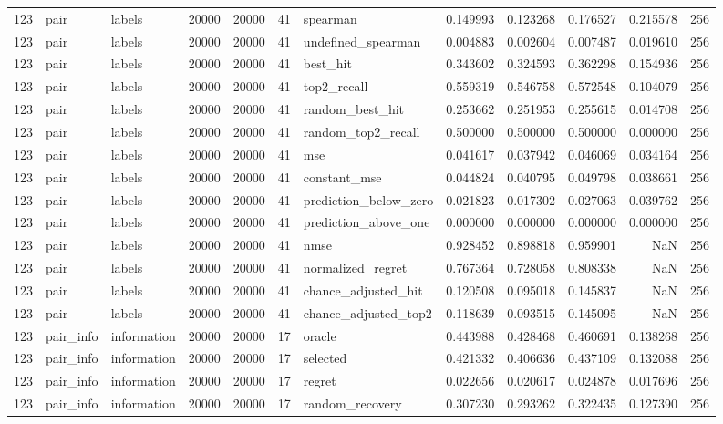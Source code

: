\begin{tabular}{rllrrrlrrrrr}
123 & pair & labels & 20000 & 20000 & 41 & spearman & 0.149993 & 0.123268 & 0.176527 & 0.215578 & 256 \\
123 & pair & labels & 20000 & 20000 & 41 & undefined_spearman & 0.004883 & 0.002604 & 0.007487 & 0.019610 & 256 \\
123 & pair & labels & 20000 & 20000 & 41 & best_hit & 0.343602 & 0.324593 & 0.362298 & 0.154936 & 256 \\
123 & pair & labels & 20000 & 20000 & 41 & top2_recall & 0.559319 & 0.546758 & 0.572548 & 0.104079 & 256 \\
123 & pair & labels & 20000 & 20000 & 41 & random_best_hit & 0.253662 & 0.251953 & 0.255615 & 0.014708 & 256 \\
123 & pair & labels & 20000 & 20000 & 41 & random_top2_recall & 0.500000 & 0.500000 & 0.500000 & 0.000000 & 256 \\
123 & pair & labels & 20000 & 20000 & 41 & mse & 0.041617 & 0.037942 & 0.046069 & 0.034164 & 256 \\
123 & pair & labels & 20000 & 20000 & 41 & constant_mse & 0.044824 & 0.040795 & 0.049798 & 0.038661 & 256 \\
123 & pair & labels & 20000 & 20000 & 41 & prediction_below_zero & 0.021823 & 0.017302 & 0.027063 & 0.039762 & 256 \\
123 & pair & labels & 20000 & 20000 & 41 & prediction_above_one & 0.000000 & 0.000000 & 0.000000 & 0.000000 & 256 \\
123 & pair & labels & 20000 & 20000 & 41 & nmse & 0.928452 & 0.898818 & 0.959901 & NaN & 256 \\
123 & pair & labels & 20000 & 20000 & 41 & normalized_regret & 0.767364 & 0.728058 & 0.808338 & NaN & 256 \\
123 & pair & labels & 20000 & 20000 & 41 & chance_adjusted_hit & 0.120508 & 0.095018 & 0.145837 & NaN & 256 \\
123 & pair & labels & 20000 & 20000 & 41 & chance_adjusted_top2 & 0.118639 & 0.093515 & 0.145095 & NaN & 256 \\
123 & pair_info & information & 20000 & 20000 & 17 & oracle & 0.443988 & 0.428468 & 0.460691 & 0.138268 & 256 \\
123 & pair_info & information & 20000 & 20000 & 17 & selected & 0.421332 & 0.406636 & 0.437109 & 0.132088 & 256 \\
123 & pair_info & information & 20000 & 20000 & 17 & regret & 0.022656 & 0.020617 & 0.024878 & 0.017696 & 256 \\
123 & pair_info & information & 20000 & 20000 & 17 & random_recovery & 0.307230 & 0.293262 & 0.322435 & 0.127390 & 256 \\

\end{tabular}
